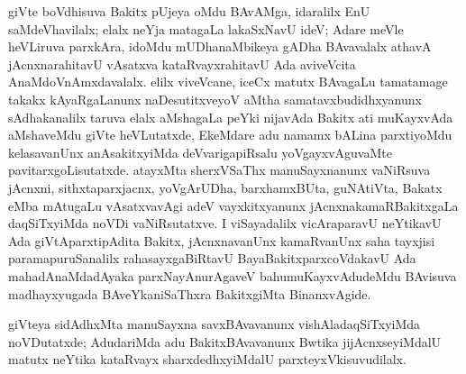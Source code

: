 giVte boVdhisuva Bakitx pUjeya oMdu BAvAMga, idaralilx EnU saMdeVhavilalx; elalx neYja matagaLa lakaSxNavU ideV; Adare meVle heVLiruva parxkAra, idoMdu mUDhanaMbikeya gADha BAvavalalx athavA jAcnxnarahitavU vAsatxva kataRvayxrahitavU Ada aviveVcita AnaMdoVnAmxdavalalx. elilx viveVcane, iceCx matutx BAvagaLu tamatamage takakx kAyaRgaLanunx naDesutitxveyoV aMtha samatavxbudidhxyanunx sAdhakanalilx taruva elalx aMshagaLa peYki nijavAda Bakitx ati muKayxvAda aMshaveMdu giVte heVLutatxde, EkeMdare adu namamx bALina parxtiyoMdu kelasavanUnx anAsakitxyiMda deVvarigapiRsalu yoVgayxvAguvaMte pavitarxgoLisutatxde. atayxMta sherxVSaThx manuSayxnanunx vaNiRsuva jAcnxni, sithxtaparxjacnx, yoVgArUDha, barxhamxBUta, guNAtiVta, Bakatx eMba mAtugaLu vAsatxvavAgi adeV vayxkitxyanunx jAcnxnakamaRBakitxgaLa daqSiTxyiMda noVDi vaNiRsutatxve. I viSayadalilx vicAraparavU neYtikavU Ada giVtAparxtipAdita Bakitx, jAcnxnavanUnx kamaRvanUnx saha tayxjisi paramapuruSanalilx rahasayxgaBiRtavU BayaBakitxparxcoVdakavU Ada mahadAnaMdadAyaka parxNayAnurAgaveV bahumuKayxvAdudeMdu BAvisuva madhayxyugada BAveYkaniSaThxra BakitxgiMta BinanxvAgide.

giVteya sidAdhxMta manuSayxna savxBAvavanunx vishAladaqSiTxyiMda noVDutatxde; AdudariMda adu BakitxBAvavanunx Bwtika jijAcnxseyiMdalU matutx neYtika kataRvayx sharxdedhxyiMdalU parxteyxVkisuvudilalx.

